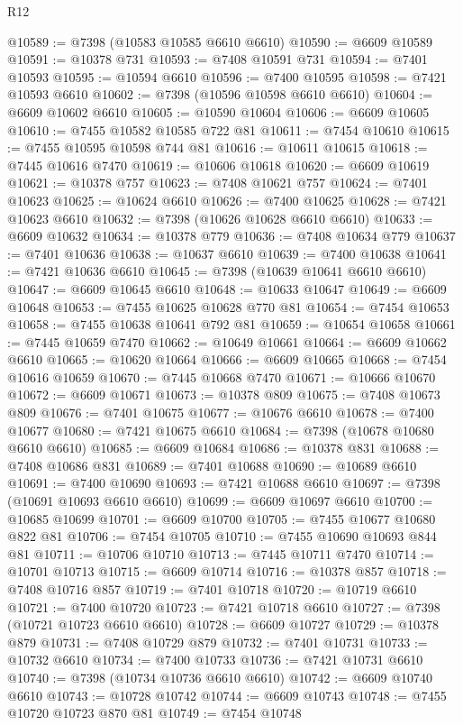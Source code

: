 \begin{lexlean}{R12}
\begin{coremodule}
{{{{{{{{{{{{{{{{{{{{{{{{{{{{{{{{{{{{{{{{{{{{{{{{{{{{{{{{{{{{{{{{{{{{{{{{{{{{{{{{{{@10589 := @7398 (@10583 @10585 @6610 @6610)
@10590 := @6609 @10589
@10591 := @10378 @731
@10593 := @7408 @10591 @731
@10594 := @7401 @10593
@10595 := @10594 @6610
@10596 := @7400 @10595
@10598 := @7421 @10593 @6610
@10602 := @7398 (@10596 @10598 @6610 @6610)
@10604 := @6609 @10602 @6610
@10605 := @10590 @10604
@10606 := @6609 @10605
@10610 := @7455 @10582 @10585 @722 @81
@10611 := @7454 @10610
@10615 := @7455 @10595 @10598 @744 @81
@10616 := @10611 @10615
@10618 := @7445 @10616 @7470
@10619 := @10606 @10618
@10620 := @6609 @10619
@10621 := @10378 @757
@10623 := @7408 @10621 @757
@10624 := @7401 @10623
@10625 := @10624 @6610
@10626 := @7400 @10625
@10628 := @7421 @10623 @6610
@10632 := @7398 (@10626 @10628 @6610 @6610)
@10633 := @6609 @10632
@10634 := @10378 @779
@10636 := @7408 @10634 @779
@10637 := @7401 @10636
@10638 := @10637 @6610
@10639 := @7400 @10638
@10641 := @7421 @10636 @6610
@10645 := @7398 (@10639 @10641 @6610 @6610)
@10647 := @6609 @10645 @6610
@10648 := @10633 @10647
@10649 := @6609 @10648
@10653 := @7455 @10625 @10628 @770 @81
@10654 := @7454 @10653
@10658 := @7455 @10638 @10641 @792 @81
@10659 := @10654 @10658
@10661 := @7445 @10659 @7470
@10662 := @10649 @10661
@10664 := @6609 @10662 @6610
@10665 := @10620 @10664
@10666 := @6609 @10665
@10668 := @7454 @10616 @10659
@10670 := @7445 @10668 @7470
@10671 := @10666 @10670
@10672 := @6609 @10671
@10673 := @10378 @809
@10675 := @7408 @10673 @809
@10676 := @7401 @10675
@10677 := @10676 @6610
@10678 := @7400 @10677
@10680 := @7421 @10675 @6610
@10684 := @7398 (@10678 @10680 @6610 @6610)
@10685 := @6609 @10684
@10686 := @10378 @831
@10688 := @7408 @10686 @831
@10689 := @7401 @10688
@10690 := @10689 @6610
@10691 := @7400 @10690
@10693 := @7421 @10688 @6610
@10697 := @7398 (@10691 @10693 @6610 @6610)
@10699 := @6609 @10697 @6610
@10700 := @10685 @10699
@10701 := @6609 @10700
@10705 := @7455 @10677 @10680 @822 @81
@10706 := @7454 @10705
@10710 := @7455 @10690 @10693 @844 @81
@10711 := @10706 @10710
@10713 := @7445 @10711 @7470
@10714 := @10701 @10713
@10715 := @6609 @10714
@10716 := @10378 @857
@10718 := @7408 @10716 @857
@10719 := @7401 @10718
@10720 := @10719 @6610
@10721 := @7400 @10720
@10723 := @7421 @10718 @6610
@10727 := @7398 (@10721 @10723 @6610 @6610)
@10728 := @6609 @10727
@10729 := @10378 @879
@10731 := @7408 @10729 @879
@10732 := @7401 @10731
@10733 := @10732 @6610
@10734 := @7400 @10733
@10736 := @7421 @10731 @6610
@10740 := @7398 (@10734 @10736 @6610 @6610)
@10742 := @6609 @10740 @6610
@10743 := @10728 @10742
@10744 := @6609 @10743
@10748 := @7455 @10720 @10723 @870 @81
@10749 := @7454 @10748
}}}}}}}}}}}}}}}}}}}}}}}}}}}}}}}}}}}}}}}}}}}}}}}}}}}}}}}}}}}}}}}}}}}}}}}}}}}}}}}}}}
\end{coremodule}
\end{lexlean}
